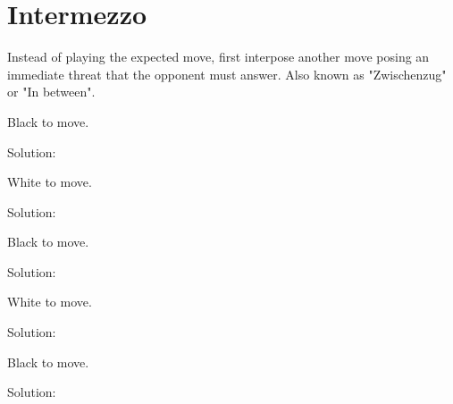 \documentclass{book}
\begin{document}
\section{Intermezzo}
Instead of playing the expected move, first interpose another move posing an immediate threat that the opponent must answer. Also known as "Zwischenzug" or "In between".\begin{multicols}{2} 
\begin{samepage} 
\newgame 


 
\showboard
 
 Black to move. 
 
Solution: 
 
\end{samepage}\begin{samepage} 
\newgame 


 
\showboard
 
 White to move. 
 
Solution: 
 
\end{samepage}\begin{samepage} 
\newgame 


 
\showboard
 
 Black to move. 
 
Solution: 
 
\end{samepage}\begin{samepage} 
\newgame 


 
\showboard
 
 White to move. 
 
Solution: 
 
\end{samepage}\begin{samepage} 
\newgame 


 
\showboard
 
 Black to move. 
 
Solution: 
 
\end{samepage}\end{multicols} 
\newpage 
\end{document}
